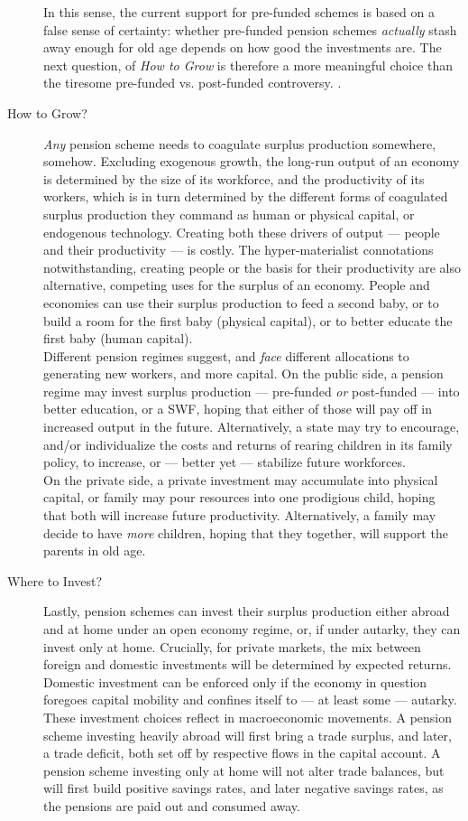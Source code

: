 \documentclass[11pt,a4paper,oneside,openright]{article}
\begin{document}
\begin{description}
{		In this sense, the current support for pre-funded schemes is based on a false sense of certainty: 
		whether pre-funded pension schemes \emph{actually} stash away enough for old age depends on how good the investments are. 
		The next question, of \emph{How to Grow} is therefore a more meaningful choice than the tiresome pre-funded vs. post-funded controversy.
	}. 
	\item[How to Grow?] \emph{Any} pension scheme needs to coagulate surplus production somewhere, somehow. 
	Excluding exogenous growth, the long-run output of an economy is determined by the size of its workforce, and the productivity of its workers, which is in turn determined by the different forms of coagulated surplus production they command as human or physical capital, or endogenous technology. 
	Creating both these drivers of output --- people and their productivity --- is costly. 
	The hyper-materialist connotations notwithstanding, creating people or the basis for their productivity are also alternative, competing uses for the surplus of an economy. 
	People and economies can use their surplus production to feed a second baby, or to build a room for the first baby (physical capital), or to better educate the first baby (human capital). \\
	Different pension regimes suggest, and \emph{face} different allocations to generating new workers, and more capital. 
	On the public side, a pension regime may invest surplus production --- pre-funded \emph{or} post-funded --- into better education, or a \gls{SWF}, hoping that either of those will pay off in increased output in the future. 
	Alternatively, a state may try to encourage, and/or individualize the costs and returns of rearing children in its family policy, to increase, or --- better yet --- stabilize future workforces. \\
	On the private side, a private investment may accumulate into physical capital, or family may pour resources into one prodigious child, hoping that both will increase future productivity. 
	Alternatively, a family may decide to have \emph{more} children, hoping that they together, will support the parents in old age.
	
	\item[Where to Invest?] Lastly, pension schemes can invest their surplus production either abroad and at home under an open economy regime, or, if under autarky, they can invest only at home. 
	Crucially, for private markets, the mix between foreign and domestic investments will be determined by expected returns. 
	Domestic investment can be enforced only if the economy in question foregoes capital mobility and confines itself to --- at least some --- autarky. \\
	These investment choices reflect in macroeconomic movements. 
	A pension scheme investing heavily abroad will first bring a trade surplus, and later, a trade deficit, both set off by respective flows in the capital account. 
	A pension scheme investing only at home will not alter trade balances, but will first build positive savings rates, and later negative savings rates, as the pensions are paid out and consumed away.
\end{description}
\end{document}
